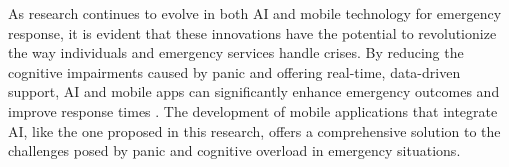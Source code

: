 As research continues to evolve in both AI and mobile technology for emergency response, it is evident that these innovations have the potential to revolutionize the way individuals and emergency services handle crises. By reducing the cognitive impairments caused by panic and offering real-time, data-driven support, AI and mobile apps can significantly enhance emergency outcomes and improve response times \cite{kirubarajan2020artificial, kiran2020artificial}. The development of mobile applications that integrate AI, like the one proposed in this research, offers a comprehensive solution to the challenges posed by panic and cognitive overload in emergency situations.
